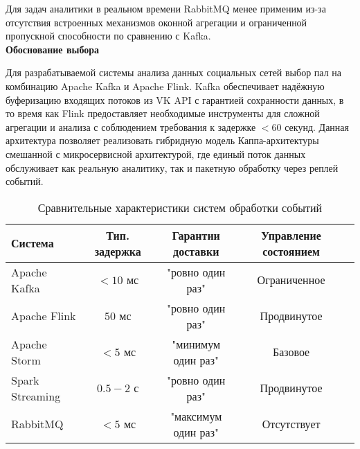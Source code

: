             Для задач аналитики в реальном времени RabbitMQ менее применим из-за отсутствия встроенных механизмов оконной агрегации и ограниченной пропускной способности по сравнению с Kafka. \\

            \textbf{Обоснование выбора}

            Для разрабатываемой системы анализа данных социальных сетей выбор пал на комбинацию Apache Kafka и Apache Flink. Kafka обеспечивает надёжную буферизацию входящих потоков из VK API с гарантией сохранности данных, в то время как Flink предоставляет необходимые инструменты для сложной агрегации и анализа с соблюдением требования к задержке $<60$ секунд. Данная архитектура позволяет реализовать гибридную модель Каппа-архитектуры смешанной с микросервисной архитектурой, где единый поток данных обслуживает как реальную аналитику, так и пакетную обработку через реплей событий.

            \begin{table}[h]
                \centering
                \caption{Сравнительные характеристики систем обработки событий}
                \label{tab:streaming-comparison}
                \begin{tabular}{|l|c|c|c|c|}
                    \hline
                    Система & Тип. задержка & Гарантии доставки & Управление состоянием \\
                    \hline
                    Apache Kafka & $<10$ мс & "ровно один раз" & Ограниченное \\
                    \hline
                    Apache Flink & $50$ мс & "ровно один раз" & Продвинутое \\
                    \hline
                    Apache Storm & $<5$ мс & "минимум один раз" & Базовое \\
                    \hline
                    Spark Streaming & $0.5-2$ с & "ровно один раз" & Продвинутое \\
                    \hline
                    RabbitMQ & $<5$ мс & "максимум один раз" & Отсутствует \\
                    \hline
                \end{tabular}
            \end{table}
\newpage
